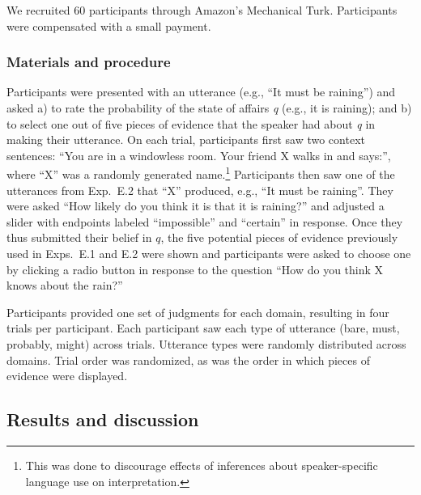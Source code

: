\documentclass[11pt]{article}
\begin{document}
We recruited 60 participants through Amazon's Mechanical Turk. Participants were compensated with a small payment.

\subsubsection{Materials and procedure}

Participants were presented with an utterance (e.g., ``It must be raining'') and asked a) to rate the probability of the state of affairs \emph{q} (e.g., it is raining); and b) to select one out of five pieces of evidence that the speaker had about \emph{q} in making their utterance. On each trial, participants first saw two context sentences: ``You are in a windowless room. Your friend X walks in and says:'', where ``X'' was a randomly generated name.\footnote{This was done to discourage effects of inferences about speaker-specific language use on interpretation.} Participants then saw one of the utterances from Exp.~E.2 that ``X'' produced, e.g., ``It must be raining''. They were asked ``How likely do you think it is that it is raining?'' and adjusted a slider with endpoints labeled ``impossible'' and ``certain'' in response. Once they thus submitted their belief in $q$, the five potential pieces of evidence previously used in Exps.~E.1 and E.2 were shown and participants were asked to choose one by clicking a radio button in response to the question ``How do you think X knows about the rain?'' 

Participants provided one set of judgments for each domain, resulting in four trials per participant. Each participant saw each type of utterance (bare, must, probably, might)  across trials. Utterance types were randomly distributed across domains. Trial order was randomized, as was the order in which pieces of evidence were displayed.

\subsection{Results and discussion}
\end{document}
